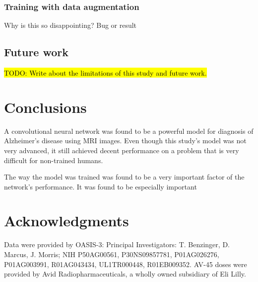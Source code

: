 \documentclass{kththesis}
\begin{document}
\subsection{Training with data augmentation}
Why is this so disappointing? Bug or result

\section{Future work}
\hl{TODO: Write about the limitations of this study and future work.}

\chapter{Conclusions}
A convolutional neural network was found to be a powerful model for diagnosis of Alzheimer’s disease using MRI images. Even though this study's model was not very advanced, it still achieved decent performance on a problem that is very difficult for non-trained humans.

The way the model was trained was found to be a very important factor of the network's performance. It was found to be especially important 

\chapter{Acknowledgments}
Data were provided by OASIS-3: Principal Investigators: T. Benzinger, D. Marcus, J. Morris; NIH P50AG00561, P30NS09857781, P01AG026276, P01AG003991, R01AG043434, UL1TR000448, R01EB009352. AV-45 doses were provided by Avid Radiopharmaceuticals, a wholly owned subsidiary of Eli Lilly.

\printbibliography[heading=bibintoc]

\appendix


\tailmatter
\end{document}

